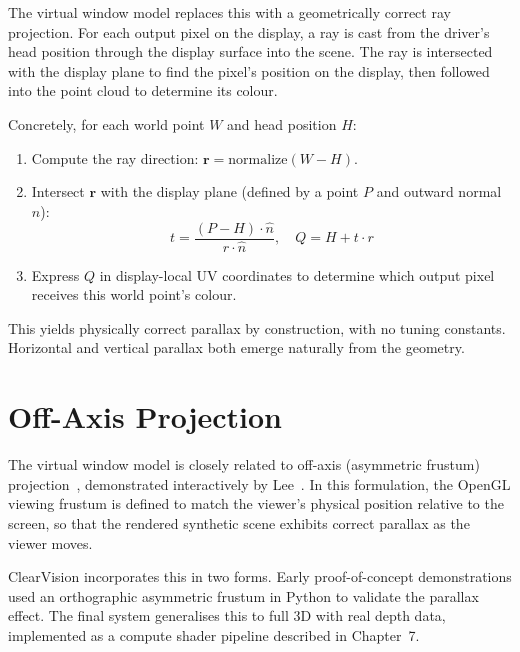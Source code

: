 \documentclass[11pt, a4paper]{report}
\begin{document}
The virtual window model replaces this with a geometrically correct ray
projection.
For each output pixel on the display, a ray is cast from the driver's
head position through the display surface into the scene.
The ray is intersected with the display plane to find the pixel's position
on the display, then followed into the point cloud to determine its colour.

Concretely, for each world point $W$ and head position $H$:

\begin{enumerate}[noitemsep]
    \item Compute the ray direction:
          $\mathbf{r} = \mathrm{normalize}(W - H)$.
    \item Intersect $\mathbf{r}$ with the display plane (defined by a
          point $P$ and outward normal $\hat{n}$):
          \begin{equation}
              t = \frac{(P - H) \cdot \hat{n}}{r \cdot \hat{n}}, \quad
              Q = H + t \cdot r
              \label{eq:ray_plane}
          \end{equation}
    \item Express $Q$ in display-local UV coordinates to determine which
          output pixel receives this world point's colour.
\end{enumerate}

This yields physically correct parallax by construction, with no tuning
constants.
Horizontal and vertical parallax both emerge naturally from the geometry.

\section{Off-Axis Projection}
\label{sec:offaxis}

The virtual window model is closely related to off-axis (asymmetric
frustum) projection~\cite{kooima2009generalized}, demonstrated
interactively by Lee~\cite{lee2008head}.
In this formulation, the OpenGL viewing frustum is defined to match the
viewer's physical position relative to the screen, so that the rendered
synthetic scene exhibits correct parallax as the viewer moves.

ClearVision incorporates this in two forms.
Early proof-of-concept demonstrations used an orthographic asymmetric
frustum in Python to validate the parallax effect.
The final system generalises this to full 3D with real depth data,
implemented as a compute shader pipeline described in Chapter~7.
\end{document}
